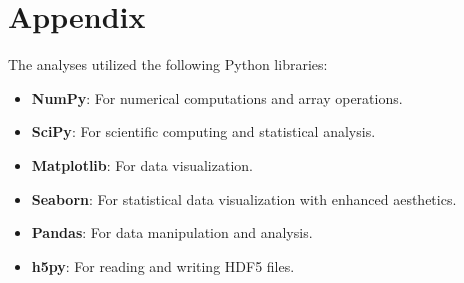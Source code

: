 \chapter{Appendix}

The analyses utilized the following Python libraries:

\begin{itemize}
    \item \textbf{NumPy}: For numerical computations and array operations.
    \item \textbf{SciPy}: For scientific computing and statistical analysis.
    \item \textbf{Matplotlib}: For data visualization.
    \item \textbf{Seaborn}: For statistical data visualization with enhanced aesthetics.
    \item \textbf{Pandas}: For data manipulation and analysis.
    \item \textbf{h5py}: For reading and writing HDF5 files.
\end{itemize}
